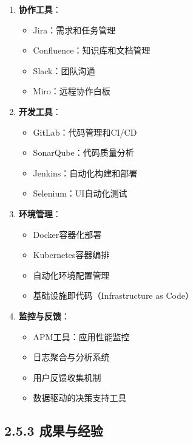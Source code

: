 \begin{enumerate}
\def\labelenumi{\arabic{enumi}.}
\tightlist
\item
  \textbf{协作工具}：

  \begin{itemize}
  \tightlist
  \item
    Jira：需求和任务管理
  \item
    Confluence：知识库和文档管理
  \item
    Slack：团队沟通
  \item
    Miro：远程协作白板
  \end{itemize}
\item
  \textbf{开发工具}：

  \begin{itemize}
  \tightlist
  \item
    GitLab：代码管理和CI/CD
  \item
    SonarQube：代码质量分析
  \item
    Jenkins：自动化构建和部署
  \item
    Selenium：UI自动化测试
  \end{itemize}
\item
  \textbf{环境管理}：

  \begin{itemize}
  \tightlist
  \item
    Docker容器化部署
  \item
    Kubernetes容器编排
  \item
    自动化环境配置管理
  \item
    基础设施即代码（Infrastructure as Code）
  \end{itemize}
\item
  \textbf{监控与反馈}：

  \begin{itemize}
  \tightlist
  \item
    APM工具：应用性能监控
  \item
    日志聚合与分析系统
  \item
    用户反馈收集机制
  \item
    数据驱动的决策支持工具
  \end{itemize}
\end{enumerate}

\subsection{2.5.3 成果与经验}\label{ux6210ux679cux4e0eux7ecfux9a8c}

